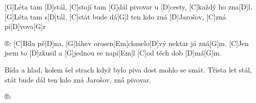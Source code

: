 
[G]Léta tam [D]stál, [C]stojí tam [G]dál
pivovar u [D]cesty, [C]každý ho zna[D]l.
[G]Léta tam s[D]tál, [C]stát bude dá[G]l
ten kdo zná [D]Jarošov, [C]zná pi[D]vova[G]r


®: [C]Bíla pě[D]na, [G]láhev orosen[Em]chmelo[D]vý nektar já zná[G]m.
[C]Jen jsem to [D]zkusil a [G]jednou se napi[Em]l
[C]od těch dob [D] má[G]m.

Bída a hlad, kolem šel strach
když bylo piva dost mohlo se smát.
Třista let stál, stát bude dál
ten kdo zná Jarošov, zná pivovar.

®: